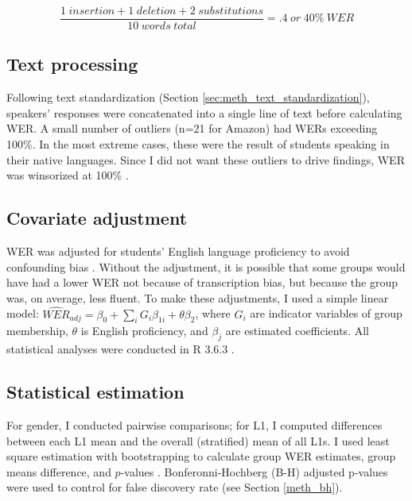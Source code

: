 \documentclass [PhD] {uclathes}
\begin{document}
$$
\frac{1 \hspace{3pt} insertion + 1 \hspace{3pt} deletion + 2 \hspace{3pt} substitutions}{10 \hspace{3pt} words \hspace{3pt} total} = .4 \hspace{3pt} or \hspace{3pt} 40\% \hspace{3pt} WER
$$

\subsection{Text processing}

Following text standardization (Section \ref{sec:meth_text_standardization}), speakers' responses were concatenated into a single line of text before calculating WER. A small number of outliers (n=21 for Amazon) had WERs exceeding 100\%. In the most extreme cases, these were the result of students speaking in their native languages. Since I did not want these outliers to drive findings, WER was winsorized at 100\% \citep{wilcox2012}.

\subsection{Covariate adjustment}
\label{sec:meth_cov}

WER was adjusted for students' English language proficiency to avoid confounding bias \citep{elwert2014}. Without the adjustment, it is possible that some groups would have had a lower WER not because of transcription bias, but because the group was, on average, less fluent. To make these adjustments, I used a simple linear model: ${\widehat{WER}}_{adj} = \beta_0 + {\textstyle\sum}_{i}G_i\beta_{1i} + \theta\beta_2$, where $G_i$ are indicator variables of group membership, $\theta$ is English proficiency, and $\beta_j$ are estimated coefficients. All statistical analyses were conducted in R 3.6.3 \citep{r2020}.

\subsection{Statistical estimation}

For gender, I conducted pairwise comparisons; for L1, I computed differences between each L1 mean and the overall (stratified) mean of all L1s. I used least square estimation with bootstrapping to calculate group WER estimates, group means difference, and $p$-values \citep{tibshirani1993}. Bonferonni-Hochberg (B-H) adjusted p-values were used to control for false discovery rate (see Section \ref{meth_bh}).
\end{document}
